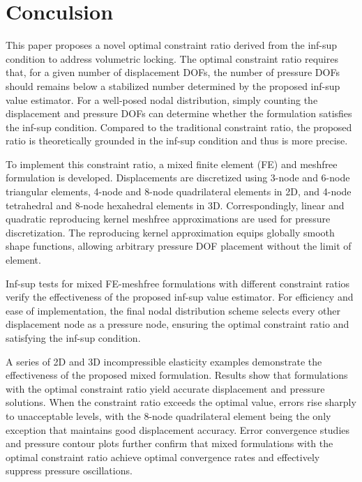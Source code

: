 \section{Conculsion}

This paper proposes a novel optimal constraint ratio derived from the inf-sup condition to address volumetric locking.
The optimal constraint ratio requires that, for a given number of displacement DOFs, the number of pressure DOFs should remains below a stabilized number determined by the proposed inf-sup value estimator.
For a well-posed nodal distribution, simply counting the displacement and pressure DOFs can determine whether the formulation satisfies the inf-sup condition.
Compared to the traditional constraint ratio, the proposed ratio is theoretically grounded in the inf-sup condition and thus is more precise.

To implement this constraint ratio, a mixed finite element (FE) and meshfree formulation is developed.
Displacements are discretized using 3-node and 6-node triangular elements, 4-node and 8-node quadrilateral elements in 2D, and 4-node tetrahedral and 8-node hexahedral elements in 3D.
Correspondingly, linear and quadratic reproducing kernel meshfree approximations are used for pressure discretization.
The reproducing kernel approximation equips globally smooth shape functions, allowing arbitrary pressure DOF placement without the limit of element.

Inf-sup tests for mixed FE-meshfree formulations with different constraint ratios verify the effectiveness of the proposed inf-sup value estimator.
For efficiency and ease of implementation, the final nodal distribution scheme selects every other displacement node as a pressure node,
ensuring the optimal constraint ratio and satisfying the inf-sup condition.

A series of 2D and 3D incompressible elasticity examples demonstrate the effectiveness of the proposed mixed formulation.
Results show that formulations with the optimal constraint ratio yield accurate displacement and pressure solutions.
When the constraint ratio exceeds the optimal value, errors rise sharply to unacceptable levels,
with the 8-node quadrilateral element being the only exception that maintains good displacement accuracy.
Error convergence studies and pressure contour plots further confirm that mixed formulations with the optimal constraint ratio achieve optimal convergence rates and effectively suppress pressure oscillations.
